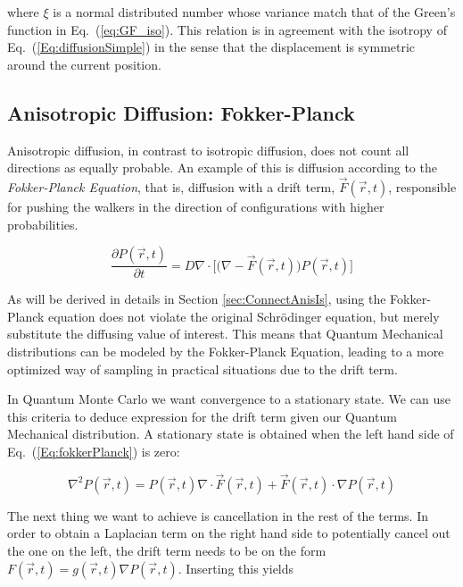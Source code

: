 where $\xi$ is a normal distributed number whose variance match that of the Green's function in Eq.~(\ref{eq:GF_iso}). This relation is in agreement with the isotropy of Eq.~(\ref{Eq:diffusionSimple}) in the sense that the displacement is symmetric around the current position.


\subsection{Anisotropic Diffusion: Fokker-Planck}
\label{sec:anisFokker}

Anisotropic diffusion, in contrast to isotropic diffusion, does not count all directions as equally probable. An example of this is diffusion according to the \textit{Fokker-Planck Equation}, that is, diffusion with a drift term, $\vec F(\vec r, t)$, responsible for pushing the walkers in the direction of configurations with higher probabilities.

\begin{equation}
 \label{Eq:fokkerPlanck}
 \frac{\partial P(\vec r, t)}{\partial t} = D\nabla\cdot\Big[\Big(\nabla - \vec F(\vec r, t)\Big) P(\vec r, t)\Big] 
\end{equation}

As will be derived in details in Section \ref{sec:ConnectAnisIs}, using the Fokker-Planck equation does not violate the original Schrödinger equation, but merely substitute the diffusing value of interest. This means that Quantum Mechanical distributions can be modeled by the Fokker-Planck Equation, leading to a more optimized way of sampling in practical situations due to the drift term. 

In Quantum Monte Carlo we want convergence to a stationary state. We can use this criteria to deduce expression for the drift term given our Quantum Mechanical distribution. A stationary state is obtained when the left hand side of Eq.~(\ref{Eq:fokkerPlanck}) is zero:

\begin{equation*}
 \nabla^2 P(\vec r, t) = P(\vec r, t)\nabla\cdot\vec F(\vec r, t) + \vec F(\vec r, t) \cdot \nabla P(\vec r, t)
\end{equation*}

The next thing we want to achieve is cancellation in the rest of the terms. In order to obtain a Laplacian term on the right hand side to potentially cancel out the one on the left, the drift term needs to be on the form $F(\vec r, t) = g(\vec r, t)\nabla P(\vec r, t)$. Inserting this yields


